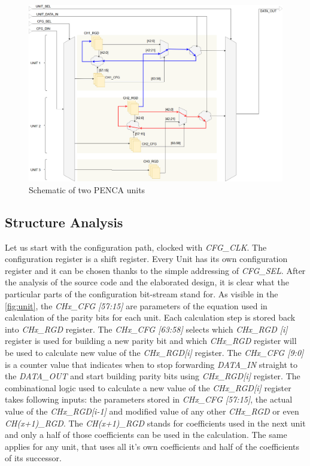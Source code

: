 \begin{figure}[h]
\centering
\includegraphics[width=\textwidth]{figures/Unit_arch.png}
\caption{Schematic of two PENCA units}
\label{fig:unit}
\end{figure}

\subsection{Structure Analysis}
Let us start with the configuration path, clocked with \textit{CFG\_CLK}. The configuration register is a shift register. Every Unit has its own configuration register and it can be chosen thanks to the simple addressing of \textit{CFG\_SEL}. After the analysis of the source code and the elaborated design, it is clear what the particular parts of the configuration bit-stream stand for. As visible in the \autoref{fig:unit}, the \textit{CHx\_CFG [57:15]} are parameters of the equation used in calculation of the parity bits for each unit. Each calculation step is stored back into \textit{CHx\_RGD} register. The \textit{CHx\_CFG [63:58]} selects which \textit{CHx\_RGD [i]} register is used for building a new parity bit and which \textit{CHx\_RGD} register will be used to calculate new value of the \textit{CHx\_RGD[i]} register. The \textit{CHx\_CFG [9:0]} is a counter value that indicates when to stop forwarding \textit{DATA\_IN} straight to the \textit{DATA\_OUT} and start building parity bits using \textit{CHx\_RGD[i]} register. The combinational logic used to calculate a new value of the \textit{CHx\_RGD[i]} register takes following inputs: the parameters stored in \textit{CHx\_CFG [57:15]}, the actual value of the \textit{CHx\_RGD[i-1]} and modified value of any other \textit{CHx\_RGD} or even \textit{CH(x+1)\_RGD}. The \textit{CH(x+1)\_RGD} stands for coefficients used in the next unit and only a half of those coefficients can be used in the calculation. The same applies for any unit, that uses all it's own coefficients and half of the coefficients of its successor.
